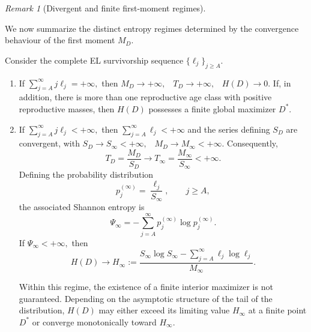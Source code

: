 \documentclass[10pt,a4paper]{amsart}
\theoremstyle{definition}
\theoremstyle{remark}
\newtheorem{rem}[thm]{Remark}
\numberwithin{equation}{section}
\begin{document}
\begin{rem}[Divergent and finite first-moment regimes]
\label{thm:first-moment-dichotomy}

We now summarize the distinct entropy regimes determined by the convergence behaviour of the first moment $M_D$.

Consider the complete EL survivorship sequence
$
\{\ell_j\}_{j\geq A}.
$

\begin{enumerate}

\item
If
$
\sum_{j=A}^{\infty}
j\ell_j
=
+\infty,
$
then
$
M_D\to+\infty,$
\, 
$T_D\to+\infty,$
\, 
$H(D)\to0.$
If, in addition, there is more than one reproductive age class
with positive reproductive masses, then \(H(D)\)
possesses a finite global maximizer $D^*$.

\item
If 
$
\sum_{j=A}^{\infty}
j\ell_j
<
+\infty,
$
then
$
\sum_{j=A}^{\infty}
\ell_j
<
+\infty
$
and the series defining $S_D$ are convergent, with  
$
S_D\to S_\infty<+\infty,$
\, 
$M_D\to M_\infty<+\infty.$
Consequently,
\[
T_D
=
\frac{M_D}{S_D}
\longrightarrow
T_\infty
=
\frac{M_\infty}{S_\infty}
<
+\infty.
\]
Defining the probability distribution
\[
p_j^{(\infty)}
=
\frac{\ell_j}{S_\infty},
\qquad
j\geq A,
\]
the associated Shannon entropy is
\[
\Psi_\infty
=
-
\sum_{j=A}^{\infty}
p_j^{(\infty)}
\log p_j^{(\infty)}.
\]
If
$
\Psi_\infty<+\infty,
$
then
\[
H(D)
\longrightarrow
H_\infty
:=
\frac{
S_\infty\log S_\infty
-
\sum_{j=A}^{\infty}
\ell_j\log\ell_j
}{
M_\infty
}.
\]

Within this regime, the existence of a finite interior maximizer is not guaranteed. 
Depending on the asymptotic structure of the tail of the distribution, $H(D)$ may either exceed its 
limiting value $H_\infty$ at a finite point $D^*$  or converge monotonically toward $H_\infty$.


\end{enumerate}

\end{rem}
\end{document}
